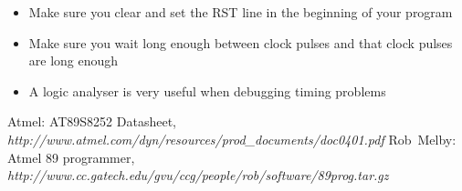 \documentclass[a4paper]{article}
\begin{document}
\begin{itemize}
\item Make sure you clear and set the RST line in 
the beginning of your program
\item Make sure you wait long enough between clock pulses and that 
clock pulses are long enough
\item A logic analyser is very useful when debugging timing problems
\end{itemize}

\nocite{*}

\begin{thebibliography}{99}
\bibitem{} Atmel: AT89S8252 Datasheet, \emph{http://www.atmel.com/dyn/resources/prod\_documents/doc0401.pdf}
\bibitem{} Rob~Melby: Atmel 89 programmer, \emph{http://www.cc.gatech.edu/gvu/ccg/people/rob/software/89prog.tar.gz}
\end{thebibliography}
\end{document}
